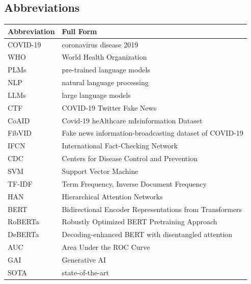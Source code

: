 \begin{CJK*}{UTF8}{bkai}
{{%
\chapter*{Abbreviations}

\begin{tabular}{ll}
    \centering
    Abbreviation & Full Form \\
    \hline
    COVID-19 & coronavirus disease 2019 \\
    WHO&World Health Organization\\
    PLMs& pre-trained language models\\
    NLP& natural language processing\\
    LLMs& large language models\\
    CTF& COVID-19 Twitter Fake News\\
    CoAID& Covid-19 heAlthcare mIsinformation Dataset\\
    FibVID& Fake news information-broadcasting dataset of COVID-19 \\
    IFCN& International Fact-Checking Network\\
    CDC& Centers for Disease Control and Prevention\\
    SVM& Support Vector Machine\\
    TF-IDF&Term Frequency, Inverse Document Frequency\\
    HAN& Hierarchical Attention Networks\\
    BERT& Bidirectional Encoder Representations from Transformers\\
    RoBERTa& Robustly Optimized BERT Pretraining Approach\\
    DeBERTa& Decoding-enhanced BERT with disentangled attention\\
    AUC& Area Under the ROC Curve\\
    GAI&Generative AI\\
    SOTA&state-of-the-art\\

\end{tabular}
\newpage


\titleformat{\section}{\normalfont\Large\bfseries}{\thesection}{1em}{}
\titleformat{\subsection}{\normalfont\large\bfseries}{\thesubsection}{1em}{}
} %


}
\end{CJK*}
